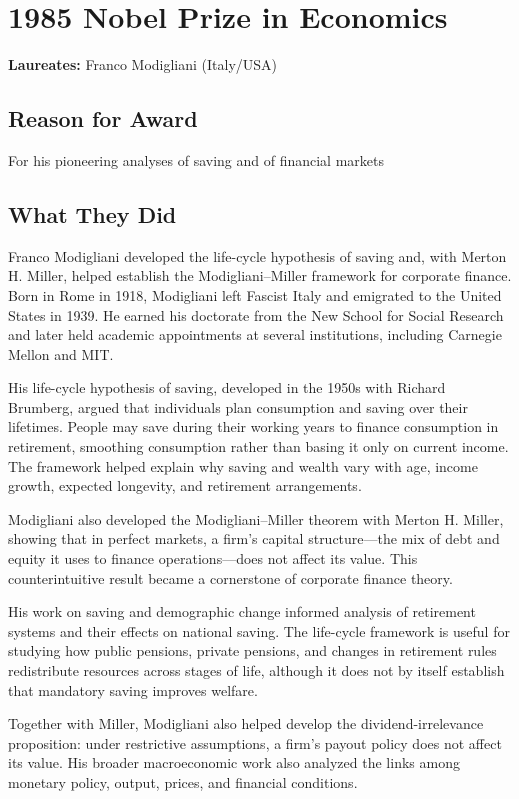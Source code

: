 \chapter{1985 Nobel Prize in Economics}
\textbf{Laureates: }Franco Modigliani (Italy/USA)

\section*{Reason for Award}
For his pioneering analyses of saving and of financial markets

\section{What They Did}
Franco Modigliani developed the life-cycle hypothesis of saving and, with
Merton H. Miller, helped establish the Modigliani--Miller framework for
corporate finance. Born in Rome in 1918, Modigliani left Fascist Italy and
emigrated to the United States in 1939. He earned his doctorate from the New
School for Social Research and later held academic appointments at several
institutions, including Carnegie Mellon and MIT.

His life-cycle hypothesis of saving, developed in the 1950s with Richard
Brumberg, argued that individuals plan consumption and saving over their
lifetimes. People may save during their working years to finance consumption
in retirement, smoothing consumption rather than basing it only on current
income. The framework helped explain why saving and wealth vary with age,
income growth, expected longevity, and retirement arrangements.

Modigliani also developed the Modigliani--Miller theorem with Merton H. Miller,
showing that in perfect markets, a firm's capital structure---the mix of debt
and equity it uses to finance operations---does not affect its value. This
counterintuitive result became a cornerstone of corporate finance theory.

His work on saving and demographic change informed analysis of retirement
systems and their effects on national saving. The life-cycle framework is
useful for studying how public pensions, private pensions, and changes in
retirement rules redistribute resources across stages of life, although it
does not by itself establish that mandatory saving improves welfare.

Together with Miller, Modigliani also helped develop the dividend-irrelevance
proposition: under restrictive assumptions, a firm's payout policy does not
affect its value. His broader macroeconomic work also analyzed the links among
monetary policy, output, prices, and financial conditions.

